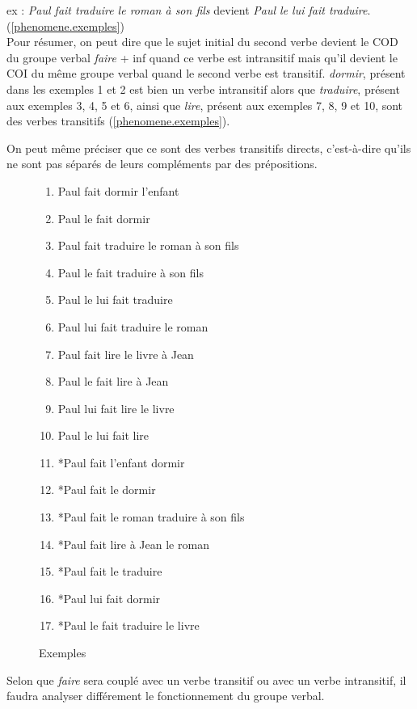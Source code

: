ex : \emph{Paul fait traduire le roman à son fils} devient \emph{Paul le lui fait traduire}. (\autoref{phenomene.exemples})\\

Pour résumer, on peut dire que le sujet initial du second verbe devient le COD du groupe verbal \emph{faire} + inf quand ce verbe est intransitif mais qu'il devient le COI du même groupe verbal quand le second verbe est transitif.
\emph{dormir}, présent dans les exemples 1 et 2 est bien un verbe intransitif alors que \emph{traduire}, présent aux exemples 3, 4, 5 et 6, ainsi que \emph{lire}, présent aux exemples 7, 8, 9 et 10, sont des verbes transitifs (\autoref{phenomene.exemples}).

On peut même préciser que ce sont des verbes transitifs directs, c'est-à-dire qu'ils ne sont pas séparés de leurs compléments par des prépositions.\\

\begin{figure}[ht]
\begin{enumerate}
  \item Paul fait dormir l'enfant
  \item Paul le fait dormir
  \item Paul fait traduire le roman à son fils
  \item Paul le fait traduire à son fils
  \item Paul le lui fait traduire
  \item Paul lui fait traduire le roman
  \item Paul fait lire le livre à Jean
  \item Paul le fait lire à Jean
  \item Paul lui fait lire le livre
  \item Paul le lui fait lire
  \item *Paul fait l'enfant dormir
  \item *Paul fait le dormir
  \item *Paul fait le roman traduire à son fils
  \item *Paul fait lire à Jean le roman
  \item *Paul fait le traduire
  \item *Paul lui fait dormir
  \item *Paul le fait traduire le livre
\end{enumerate}
\caption{Exemples \label{phenomene.exemples}}
\end{figure}

Selon que \emph{faire} sera couplé avec un verbe transitif ou avec un verbe intransitif, il faudra analyser différement le fonctionnement du groupe verbal.\\

